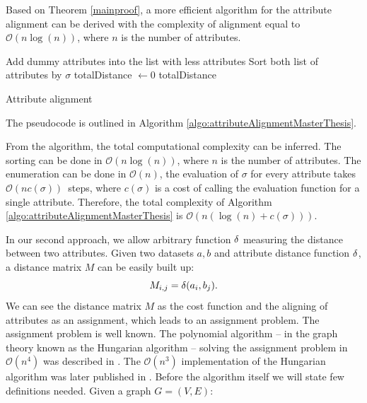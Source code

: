 \begin{corollary}
Based on Theorem \ref{mainproof}, a more efficient algorithm for the attribute alignment can be derived with the complexity of alignment equal to $\mathcal{O}(n\log(n))$, where $n$ is the number of attributes.
\end{corollary}

\IncMargin{1em}
\begin{algorithm}
\BlankLine
Add dummy attributes into the list with less attributes\;
Sort both list of attributes by $\sigma$\;
totalDistance $\leftarrow 0$\;
\Return totalDistance\;
\caption{Attribute alignment}
\label{algo:attributeAlignmentMasterThesis}
\end{algorithm}\DecMargin{1em}

The pseudocode is outlined in Algorithm \ref{algo:attributeAlignmentMasterThesis}.

From the algorithm, the total computational complexity can be inferred. The sorting can be done in $\mathcal{O}(n\log(n))$, where $n$ is the number of attributes. The enumeration can be done in $\mathcal{O}(n)$, the evaluation of $\sigma$ for every attribute takes $\mathcal{O}(nc(\sigma))$~steps, where $c(\sigma)$ is a cost of calling the evaluation function for a single attribute. Therefore, the total complexity of Algorithm \ref{algo:attributeAlignmentMasterThesis} is  $\mathcal{O}(n(\log(n)+c(\sigma))).$

In our second approach, we allow arbitrary function $\delta$ measuring the distance between two attributes. Given two datasets $a,b$ and attribute distance function $\delta$, a distance matrix $M$ can be easily built up:
\begin{equation}
M_{i,j} = \delta(a_i,b_j).	
\end{equation}
We can see the distance matrix $M$ as the cost function and the aligning of attributes as an assignment, which leads to an assignment problem. The assignment problem is well known. The polynomial algorithm -- in the graph theory known as the Hungarian algorithm -- solving the assignment problem in $\mathcal{O}(n^4)$ was described in \cite{KuhnHungarian}. The $\mathcal{O}(n^3)$ implementation of the Hungarian algorithm was later published in \cite{KarpHungarian}.
Before the algorithm itself we will state few definitions needed. Given a graph $G = (V, E)$:  

